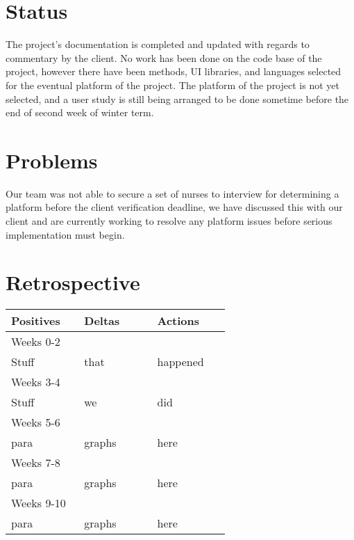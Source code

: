 \documentclass[onecolumn, draftclsnofoot,10pt, compsoc]{IEEEtran}
\begin{document}
\section{Status}
The project's documentation is completed and updated with regards to commentary by the client.
No work has been done on the code base of the project, however there have been methods, UI libraries, and languages selected for the eventual platform of the project.
The platform of the project is not yet selected, and a user study is still being arranged to be done sometime before the end of second week of winter term.
\section{Problems}
Our team was not able to secure a set of nurses to interview for determining a platform before the client verification deadline, we have discussed this with our client and are currently working to resolve any platform issues before serious implementation must begin.
\section{Retrospective}
\begin{tabular}{p{0.3\linewidth} p{0.3\linewidth} p{0.3\linewidth}}
\large{Positives} & \large{Deltas} & \large{Actions}\\
\hline
Weeks 0-2 & \nobreakspace & \nobreakspace\\
\hline
Stuff & that & happened\\
\hline
Weeks 3-4 \nobreakspace & \nobreakspace\\
\hline
Stuff & we & did\\
\hline
Weeks 5-6 \nobreakspace & \nobreakspace\\
\hline
para & graphs & here\\
\hline
Weeks 7-8 \nobreakspace & \nobreakspace\\
\hline
para & graphs & here\\
\hline
Weeks 9-10 \nobreakspace & \nobreakspace\\
\hline
para & graphs & here\\
\hline


\end{tabular}
\end{document}
